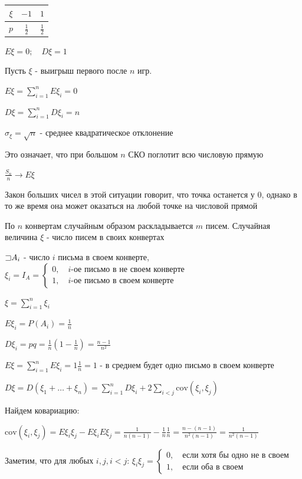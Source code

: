 \documentclass[12pt]{article}
\begin{document}
    \begin{tabular}{c|c|c}
        $\xi$ & $-1$        & $1$    \\
        \hline
        $p$   & $\frac{1}{2}$ & $\frac{1}{2}$
    \end{tabular}

    \smallvspace

    $E\xi = 0; \quad D\xi = 1$

    Пусть $\xi$ - выигрыш первого после $n$ игр.

    $E\xi = \sum_{i = 1}^n E\xi_i = 0$

    $D\xi = \sum_{i = 1}^n D\xi_i = n$

    $\sigma_\xi = \sqrt{n}$ - среднее квадратическое отклонение

    Это означает, что при большом $n$ СКО поглотит всю числовую прямую

    $\frac{S_n}{n} \to E\xi$

    Закон больших чисел в этой ситуации говорит, что точка останется у 0, однако в то же время она может оказаться на любой точке на числовой прямой

    \Ex По $n$ конвертам случайным образом раскладывается $m$ писем. Случайная величина $\xi$ - число писем в своих конвертах

    $\mathord{\sqsupset} A_i$ - число $i$ письма в своем конверте, $\xi_i = I_A = \begin{cases}0, \quad i\text{-ое письмо в не своем конверте} \\ 1, \quad i\text{-ое письмо в своем конверте} \end{cases}$

    $\xi = \sum_{i = 1}^n \xi_i$

    $E\xi_i = P(A_i) = \frac{1}{n}$

    $D\xi_i = pq = \frac{1}{n} (1 - \frac{1}{n}) = \frac{n - 1}{n^2}$

    $E\xi = \sum_{i = 1}^n E\xi_i = 1 \frac{1}{n} = 1$ - в среднем будет одно письмо в своем конверте

    $D\xi = D(\xi_1 + \dots + \xi_n) = \sum_{i = 1}^n D\xi_i + 2\sum_{i < j} \mathrm{cov} (\xi_i, \xi_j)$

    Найдем ковариацию:

    $\mathrm{cov}(\xi_i, \xi_j) = E\xi_i \xi_j - E\xi_i E\xi_j = \frac{1}{n(n - 1)} - \frac{1}{n}\frac{1}{n} = \frac{n - (n - 1)}{n^2(n - 1)} = \frac{1}{n^2(n - 1)}$

    Заметим, что для любых $i, j, i < j$: $\xi_i \xi_j = \begin{cases}0, \quad \text{если хотя бы одно не в своем} \\ 1, \quad \text{если оба в своем}\end{cases}$
    
\end{document}
